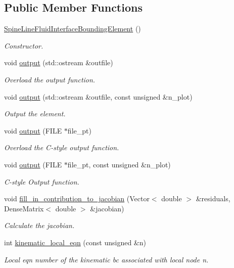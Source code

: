 \subsection*{Public Member Functions}
\begin{DoxyCompactItemize}
\item 
\hyperlink{classoomph_1_1SpineLineFluidInterfaceBoundingElement_a27c79d149485d2269ed42136914635e1}{Spine\+Line\+Fluid\+Interface\+Bounding\+Element} ()
\begin{DoxyCompactList}\small\item\em Constructor. \end{DoxyCompactList}\item 
void \hyperlink{classoomph_1_1SpineLineFluidInterfaceBoundingElement_a5c074690d693fa7fb349b22e926064b4}{output} (std\+::ostream \&outfile)
\begin{DoxyCompactList}\small\item\em Overload the output function. \end{DoxyCompactList}\item 
void \hyperlink{classoomph_1_1SpineLineFluidInterfaceBoundingElement_a77acf17ce730f50acd0d850e7460fc4d}{output} (std\+::ostream \&outfile, const unsigned \&n\+\_\+plot)
\begin{DoxyCompactList}\small\item\em Output the element. \end{DoxyCompactList}\item 
void \hyperlink{classoomph_1_1SpineLineFluidInterfaceBoundingElement_ab34fbdcd7785ab6a731a3b5d50896829}{output} (F\+I\+LE $\ast$file\+\_\+pt)
\begin{DoxyCompactList}\small\item\em Overload the C-\/style output function. \end{DoxyCompactList}\item 
void \hyperlink{classoomph_1_1SpineLineFluidInterfaceBoundingElement_ab1dbf8b8c22f78d08d431e06db80793a}{output} (F\+I\+LE $\ast$file\+\_\+pt, const unsigned \&n\+\_\+plot)
\begin{DoxyCompactList}\small\item\em C-\/style Output function. \end{DoxyCompactList}\item 
void \hyperlink{classoomph_1_1SpineLineFluidInterfaceBoundingElement_a3f44f30b5cdc47b997dbc3fd463d2038}{fill\+\_\+in\+\_\+contribution\+\_\+to\+\_\+jacobian} (Vector$<$ double $>$ \&residuals, Dense\+Matrix$<$ double $>$ \&jacobian)
\begin{DoxyCompactList}\small\item\em Calculate the jacobian. \end{DoxyCompactList}\item 
int \hyperlink{classoomph_1_1SpineLineFluidInterfaceBoundingElement_a0c31dba3e151540261753679b431b04a}{kinematic\+\_\+local\+\_\+eqn} (const unsigned \&n)
\begin{DoxyCompactList}\small\item\em Local eqn number of the kinematic bc associated with local node n. \end{DoxyCompactList}\end{DoxyCompactItemize}
